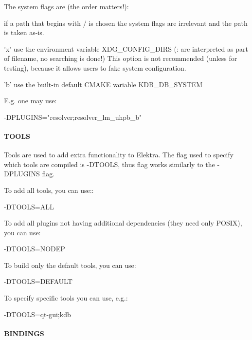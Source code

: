The system flags are (the order matters!)\+:


\begin{DoxyItemize}
\item if a path that begins with / is chosen the system flags are irrelevant and the path is taken as-\/is.
\item 'x' use the environment variable X\+D\+G\+\_\+\+C\+O\+N\+F\+I\+G\+\_\+\+D\+I\+R\+S (\+: are interpreted as part of filename, no searching is done!) This option is not recommended (unless for testing), because it allows users to fake system configuration.
\item 'b' use the built-\/in default C\+M\+A\+K\+E variable K\+D\+B\+\_\+\+D\+B\+\_\+\+S\+Y\+S\+T\+E\+M
\end{DoxyItemize}

E.\+g. one may use\+: \begin{DoxyVerb}    -DPLUGINS="resolver;resolver_lm_uhpb_b"
\end{DoxyVerb}


\paragraph*{T\+O\+O\+L\+S}

Tools are used to add extra functionality to Elektra. The flag used to specify which tools are compiled is {\ttfamily -\/\+D\+T\+O\+O\+L\+S}, thus flag works similarly to the {\ttfamily -\/\+D\+P\+L\+U\+G\+I\+N\+S} flag.

To add all tools, you can use\+:\+: \begin{DoxyVerb}    -DTOOLS=ALL
\end{DoxyVerb}


To add all plugins not having additional dependencies (they need only P\+O\+S\+I\+X), you can use\+: \begin{DoxyVerb}    -DTOOLS=NODEP
\end{DoxyVerb}


To build only the default tools, you can use\+: \begin{DoxyVerb}    -DTOOLS=DEFAULT
\end{DoxyVerb}


To specify specific tools you can use, e.\+g.\+: \begin{DoxyVerb}    -DTOOLS=qt-gui;kdb
\end{DoxyVerb}


\paragraph*{B\+I\+N\+D\+I\+N\+G\+S}

